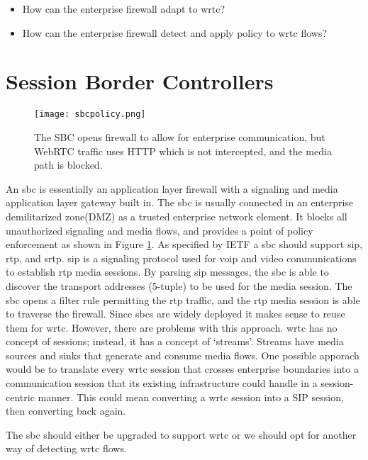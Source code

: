 \begin{itemize}
\item{How can the enterprise firewall adapt to \gls{wrtc}?}
\item{How can the enterprise firewall detect and apply policy to \gls{wrtc} flows?}
\end{itemize}

\section{Session Border Controllers}

\begin{figure}[here]
\centerline{\texttt{[image: sbcpolicy.png]}}
\caption{The SBC opens firewall to allow for enterprise communication, but WebRTC traffic uses HTTP which is not intercepted, and the media path is blocked.}
\label{fig:sbc-policy}
\end{figure}

An \gls{sbc} is essentially an application layer firewall with a signaling and media application layer gateway built in. The \gls{sbc} is usually connected in an enterprise demilitarized zone(DMZ) as a trusted enterprise network element. It blocks all unauthorized signaling and media flows, and provides a point of policy enforcement as shown in Figure \ref{fig:sbc-policy}. As specified by IETF\cite{sbc} a \gls{sbc} should support \gls{sip}, \gls{rtp}, and \gls{srtp}. \gls{sip} is a signaling protocol used for \gls{voip} and video communications to establish \gls{rtp} media sessions. By parsing \gls{sip} messages, the \gls{sbc} is able to discover the transport addresses (5-tuple) to be used for the media session. The \gls{sbc} opens a filter rule permitting the \gls{rtp} traffic, and the \gls{rtp} media session is able to traverse the firewall. Since \gls{sbc}s are widely deployed it makes sense to reuse them for \gls{wrtc}. However, there are problems with this approach. \gls{wrtc} has no concept of sessions; instead, it has a concept of `streams'. Streams have media sources and sinks that generate and consume media flows. One possible apporach would be to translate every \gls{wrtc} session that crosses enterprise boundaries into a communication session that its existing infrastructure could handle in a session-centric manner. This could mean converting a \gls{wrtc} session into a SIP session, then converting back again.

The \gls{sbc} should either be upgraded to support \gls{wrtc} or we should opt for another way of detecting \gls{wrtc} flows.

